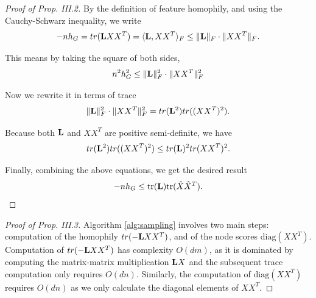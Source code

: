 \documentclass[conference]{IEEEtran}
\theoremstyle{definition}
\begin{document}
\begin{proof}[Proof of Prop. III.2]
By the definition of feature homophily, and using the Cauchy-Schwarz inequality, we write
\begin{equation}
    -nh_{G} = tr({\mathbf L} XX^T) = \langle {\ensuremath{\mathbf L}}, XX^T \rangle_F \leq \| {\mathbf L} \|_F \cdot \|XX^T\|_F \text{.}
\end{equation}

This means by taking the square of both sides, 
\begin{equation}
    n^2h_G^2 \leq \| {\mathbf L} \|_F^2 \cdot \|XX^T\|_F^2
\end{equation}

Now we rewrite it in terms of trace
\begin{equation}
    \| {\mathbf L} \|_F^2 \cdot \|XX^T\|_F^2 = tr({\mathbf L}^2) tr((XX^T)^2) \text{.}
\end{equation}

Because both ${\mathbf L}$ and $XX^T$ are positive semi-definite, we have
\begin{equation}
    tr({\mathbf L}^2) tr((XX^T)^2) \leq tr({\mathbf L})^2tr(XX^T)^2 \text{.}
\end{equation}

Finally, combining the above equations, we get the desired result
    \begin{equation}
        -nh_G \leq \text{tr}({\mathbf L})\text{tr}(\hat{X}\hat{X}^T) \text{.}
    \end{equation}
\end{proof}

\begin{proof}[Proof of Prop. III.3]
Algorithm \ref{alg:sampling} involves two main steps: computation of the homophily $tr(-{\mathbf L} XX^T)$, and of the node scores $\mbox{diag}(XX^T)$. Computation of $tr(-{\mathbf L} XX^T)$ has complexity $O(dm)$, as it is dominated by computing the matrix-matrix multiplication ${\mathbf L} X$ and the subsequent trace computation only requires $O(dn)$. Similarly, the computation of $\mbox{diag}(XX^T)$ requires $O(dn)$ as we only calculate the diagonal elements of $XX^T$.
\end{proof}
\end{document}
